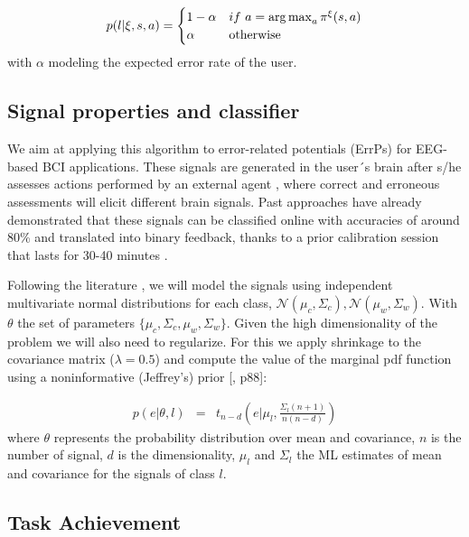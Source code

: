 \begin{equation*}
    p(l | \xi, s, a) = 
    \begin{cases}
    1-\alpha               & if~a = \argmax_a \pi^{\xi}(s,a)\\
        \alpha             & \text{otherwise}\\
   \end{cases}
\end{equation*}
with $\alpha$ modeling the expected error rate of the user. 

\subsection{Signal properties and classifier}

We aim at applying this algorithm to error-related potentials (ErrPs) for EEG-based BCI applications. These signals are generated in the user´s brain after s/he assesses actions performed by an external agent \cite{chavarriaga2010learning}, where correct and erroneous assessments will elicit different brain signals. Past approaches have already demonstrated that these signals can be classified online with accuracies of around 80\% and translated into binary feedback, thanks to a prior calibration session that lasts for 30-40 minutes \cite{chavarriaga2010learning, iturrate2013task}.

Following the literature \cite{blankertz2010single}, we will model the signals using independent multivariate normal distributions for each class, $\mathcal{N}(\mu_c, \Sigma_c), \mathcal{N}(\mu_w, \Sigma_w)$. With $\theta$ the set of parameters $\{\mu_c, \Sigma_c,\mu_w, \Sigma_w\}$. Given the high dimensionality of the problem we will also need to regularize. For this we apply shrinkage to the covariance matrix ($\lambda = 0.5$) and compute the value of the marginal pdf function using a noninformative (Jeffrey's) prior [\cite{gelman2003bayesian}, p88]:

\begin{eqnarray}
p(e|\theta, l) & = & t_{n-d}(e | \mu_l,\frac{\Sigma_l (n+1)}{n(n-d)})
\label{eq:prior}
\end{eqnarray}
where $\theta$ represents the probability distribution over mean and covariance, $n$ is the number of signal, $d$ is the dimensionality, $\mu_l$ and $\Sigma_l$ the ML estimates of mean and covariance for the signals of class $l$.

\subsection{Task Achievement}

